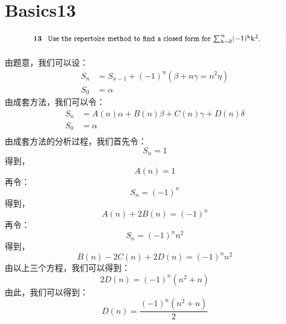 \documentclass[]{article}
\begin{document}
\section*{Basics13}
\begin{figure}[H]
	\includegraphics[scale=1]{Q4}
\end{figure}
由题意，我们可以设：
\begin{align}
	S_{n} &= S_{n-1} + (-1)^n(\beta+n\gamma=n^2\eta)  \\
	S_{0} &= \alpha
\end{align}
由成套方法，我们可以令：
\begin{align}
	S_{n} &= A(n)\alpha + B(n)\beta + C(n)\gamma + D(n)\delta \\
	S_{0} &= \alpha\\
\end{align}
由成套方法的分析过程，我们首先令：
\begin{equation}
	S_{n} = 1
\end{equation}
得到，
\begin{equation}
	A(n) = 1
\end{equation}
再令：
\begin{equation}
	S_{n} = (-1)^n
\end{equation}
得到，
\begin{equation}
	A(n)+2B(n) = (-1)^n
\end{equation}
再令：
\begin{equation}
	S_{n} = (-1)^n n^2
\end{equation}
得到，
\begin{equation}
	B(n)-2C(n)+2D(n) = (-1)^n n^2
\end{equation}
由以上三个方程，我们可以得到：
\begin{equation}
	2D(n) = (-1)^n (n^2+n)
\end{equation}
由此，我们可以得到：
\begin{equation}
	D(n) = \frac{(-1)^n (n^2+n)}{2}
\end{equation}
\end{document}
